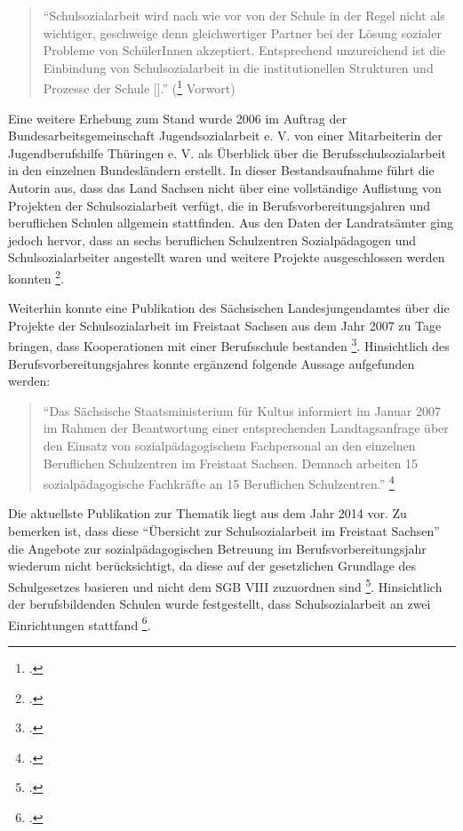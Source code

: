 \begin{quotation}
\noindent
	"`Schulsozialarbeit wird nach wie vor von der Schule in der Regel nicht als wichtiger, geschweige denn gleichwertiger Partner bei der Lösung sozialer Probleme von SchülerInnen akzeptiert. Entsprechend unzureichend ist die Einbindung von Schulsozialarbeit in die institutionellen Strukturen und Prozesse der Schule [\punkte]."' (\footcite[vgl.]{LSS2004} Vorwort)
\end{quotation}

\noindent
Eine weitere Erhebung zum Stand wurde 2006 im Auftrag der Bundesarbeitsgemeinschaft Jugendsozialarbeit e. V. von einer Mitarbeiterin der Jugendberufshilfe Thüringen e. V. als Überblick über die Berufsschulsozialarbeit in den einzelnen Bundesländern erstellt. In dieser Bestandsaufnahme führt die Autorin aus, dass das Land Sachsen nicht über eine vollständige Auflistung von Projekten der Schulsozialarbeit verfügt, die in Berufsvorbereitungsjahren und beruflichen Schulen allgemein stattfinden. Aus den Daten der Landratsämter ging jedoch hervor, dass an sechs beruflichen Schulzentren Sozialpädagogen und Schulsozialarbeiter angestellt waren und weitere Projekte ausgeschlossen werden konnten \footcite[vgl.][28]{Lassmann2006}.

Weiterhin konnte eine Publikation des Sächsischen Landesjungendamtes über die Projekte der Schulsozialarbeit im Freistaat Sachsen aus dem Jahr 2007 zu Tage bringen, dass Kooperationen mit einer Berufsschule bestanden \footcite[vgl.][4]{SLFS2007}. Hinsichtlich des Berufsvorbereitungsjahres konnte ergänzend folgende Aussage aufgefunden werden: 

\begin{quotation}
\noindent
	"`Das Sächsische Staatsministerium für Kultus informiert im Januar 2007 im Rahmen der Beantwortung einer entsprechenden Landtagsanfrage über den Einsatz von sozialpädagogischem Fachpersonal an den einzelnen Beruflichen Schulzentren im Freistaat Sachsen. Demnach arbeiten 15 sozialpädagogische Fachkräfte an 15 Beruflichen Schulzentren."' \footcite[vgl.][13]{SLFS2007}
\end{quotation}

\noindent
Die aktuellste Publikation zur Thematik liegt aus dem Jahr 2014 vor. Zu bemerken ist, dass diese "`Übersicht zur Schulsozialarbeit im Freistaat Sachsen"' die Angebote zur sozialpädagogischen Betreuung im Berufsvorbereitungsjahr wiederum nicht berücksichtigt, da diese auf der gesetzlichen Grundlage des Schulgesetzes basieren und nicht dem SGB VIII zuzuordnen sind \footcite[vgl.][3]{SMSSSV2014}. Hinsichtlich der berufsbildenden Schulen wurde festgestellt, dass Schulsozialarbeit an zwei Einrichtungen stattfand \footcite[vgl.][5]{SMSSSV2014}. 

